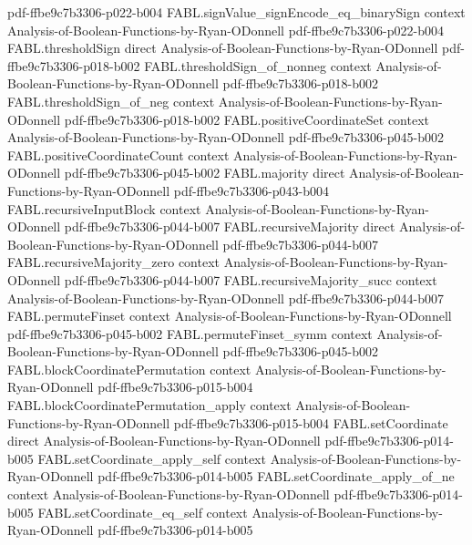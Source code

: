\begin{theorem}
  {pdf-ffbe9c7b3306-p022-b004}
\proofstep
  {FABL.signValue_signEncode_eq_binarySign}
  {context}
  {Analysis-of-Boolean-Functions-by-Ryan-ODonnell}
  {pdf-ffbe9c7b3306-p022-b004}
\proofstep
  {FABL.thresholdSign}
  {direct}
  {Analysis-of-Boolean-Functions-by-Ryan-ODonnell}
  {pdf-ffbe9c7b3306-p018-b002}
\proofstep
  {FABL.thresholdSign_of_nonneg}
  {context}
  {Analysis-of-Boolean-Functions-by-Ryan-ODonnell}
  {pdf-ffbe9c7b3306-p018-b002}
\proofstep
  {FABL.thresholdSign_of_neg}
  {context}
  {Analysis-of-Boolean-Functions-by-Ryan-ODonnell}
  {pdf-ffbe9c7b3306-p018-b002}
\proofstep
  {FABL.positiveCoordinateSet}
  {context}
  {Analysis-of-Boolean-Functions-by-Ryan-ODonnell}
  {pdf-ffbe9c7b3306-p045-b002}
\proofstep
  {FABL.positiveCoordinateCount}
  {context}
  {Analysis-of-Boolean-Functions-by-Ryan-ODonnell}
  {pdf-ffbe9c7b3306-p045-b002}
\proofstep
  {FABL.majority}
  {direct}
  {Analysis-of-Boolean-Functions-by-Ryan-ODonnell}
  {pdf-ffbe9c7b3306-p043-b004}
\proofstep
  {FABL.recursiveInputBlock}
  {context}
  {Analysis-of-Boolean-Functions-by-Ryan-ODonnell}
  {pdf-ffbe9c7b3306-p044-b007}
\proofstep
  {FABL.recursiveMajority}
  {direct}
  {Analysis-of-Boolean-Functions-by-Ryan-ODonnell}
  {pdf-ffbe9c7b3306-p044-b007}
\proofstep
  {FABL.recursiveMajority_zero}
  {context}
  {Analysis-of-Boolean-Functions-by-Ryan-ODonnell}
  {pdf-ffbe9c7b3306-p044-b007}
\proofstep
  {FABL.recursiveMajority_succ}
  {context}
  {Analysis-of-Boolean-Functions-by-Ryan-ODonnell}
  {pdf-ffbe9c7b3306-p044-b007}
\proofstep
  {FABL.permuteFinset}
  {context}
  {Analysis-of-Boolean-Functions-by-Ryan-ODonnell}
  {pdf-ffbe9c7b3306-p045-b002}
\proofstep
  {FABL.permuteFinset_symm}
  {context}
  {Analysis-of-Boolean-Functions-by-Ryan-ODonnell}
  {pdf-ffbe9c7b3306-p045-b002}
\proofstep
  {FABL.blockCoordinatePermutation}
  {context}
  {Analysis-of-Boolean-Functions-by-Ryan-ODonnell}
  {pdf-ffbe9c7b3306-p015-b004}
\proofstep
  {FABL.blockCoordinatePermutation_apply}
  {context}
  {Analysis-of-Boolean-Functions-by-Ryan-ODonnell}
  {pdf-ffbe9c7b3306-p015-b004}
\proofstep
  {FABL.setCoordinate}
  {direct}
  {Analysis-of-Boolean-Functions-by-Ryan-ODonnell}
  {pdf-ffbe9c7b3306-p014-b005}
\proofstep
  {FABL.setCoordinate_apply_self}
  {context}
  {Analysis-of-Boolean-Functions-by-Ryan-ODonnell}
  {pdf-ffbe9c7b3306-p014-b005}
\proofstep
  {FABL.setCoordinate_apply_of_ne}
  {context}
  {Analysis-of-Boolean-Functions-by-Ryan-ODonnell}
  {pdf-ffbe9c7b3306-p014-b005}
\proofstep
  {FABL.setCoordinate_eq_self}
  {context}
  {Analysis-of-Boolean-Functions-by-Ryan-ODonnell}
  {pdf-ffbe9c7b3306-p014-b005}

\end{theorem}

